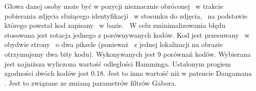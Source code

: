 Głowa danej osoby może być w pozycji nieznacznie obróconej ~w trakcie pobierania zdjęcia służącego identyfikacji ~w stosunku do zdjęcia, ~na podstawie  którego powstał kod zapisany  ~w bazie. ~W celu zminimalizowania błędu stosowana jest rotacja jednego z porównywanych kodów. Kod jest przesuwany ~w obydwie strony ~o dwa piksele (ponieważ ~z jednej lokalizacji na obrazie otrzymujemy dwa bity kodu). Wykonywanych jest 9 porównań kodów. Wybierana jest najniższa wyliczona wartość odległości Hamminga. Ustalonym progiem zgodności dwóch kodów jest 0.18. Jest to inna wartość niż w patencie Daugamana \cite{Daugman}. Jest to związane ze zmianą parametrów filtrów Gabora.

